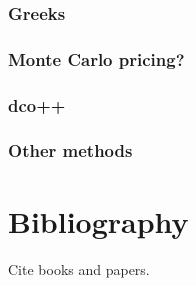 \documentclass[t]{beamer}
\begin{document}
\begin{frame}\frametitle{Greeks} \end{frame}

\begin{frame}\frametitle{Monte Carlo pricing?} \end{frame}

\begin{frame}\frametitle{dco++}\end{frame}

\begin{frame}\frametitle{Other methods} \end{frame}

\section{Bibliography}
\begin{frame} Cite books and papers. \end{frame}
\end{document}
